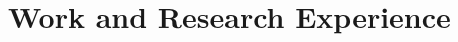 \documentclass[10pt,a4paper,sans,unicode,colorlinks,urlcolor=blue]{moderncv} %
\begin{document}

\section{Work and Research Experience}


\end{document}
